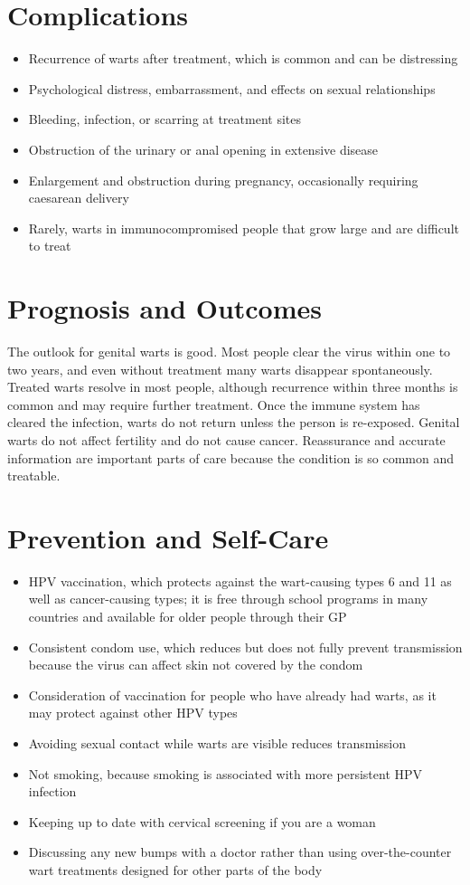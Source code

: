 \section*{Complications}
\begin{itemize}
    \item Recurrence of warts after treatment, which is common and can be distressing
    \item Psychological distress, embarrassment, and effects on sexual relationships
    \item Bleeding, infection, or scarring at treatment sites
    \item Obstruction of the urinary or anal opening in extensive disease
    \item Enlargement and obstruction during pregnancy, occasionally requiring caesarean delivery
    \item Rarely, warts in immunocompromised people that grow large and are difficult to treat
\end{itemize}

\section*{Prognosis and Outcomes}
The outlook for genital warts is good. Most people clear the virus within one to two years, and even without treatment many warts disappear spontaneously. Treated warts resolve in most people, although recurrence within three months is common and may require further treatment. Once the immune system has cleared the infection, warts do not return unless the person is re-exposed. Genital warts do not affect fertility and do not cause cancer. Reassurance and accurate information are important parts of care because the condition is so common and treatable.

\section*{Prevention and Self-Care}
\begin{itemize}
    \item HPV vaccination, which protects against the wart-causing types 6 and 11 as well as cancer-causing types; it is free through school programs in many countries and available for older people through their GP
    \item Consistent condom use, which reduces but does not fully prevent transmission because the virus can affect skin not covered by the condom
    \item Consideration of vaccination for people who have already had warts, as it may protect against other HPV types
    \item Avoiding sexual contact while warts are visible reduces transmission
    \item Not smoking, because smoking is associated with more persistent HPV infection
    \item Keeping up to date with cervical screening if you are a woman
    \item Discussing any new bumps with a doctor rather than using over-the-counter wart treatments designed for other parts of the body
\end{itemize}

